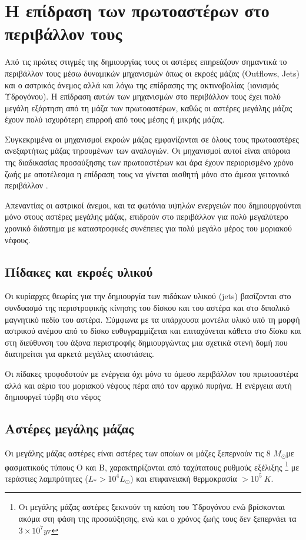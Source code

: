 \documentclass[a4paper,12pt]{memoir}
\newcommand{\sm}{$M_{\odot}$}
\begin{document}
\section{Η επίδραση των πρωτοαστέρων στο περιβάλλον τους}

Από τις πρώτες στιγμές της δημιουργίας τους οι αστέρες επηρεάζουν σημαντικά το περιβάλλον τους μέσω δυναμικών μηχανισμών όπως οι εκροές μάζας (Outflows, Jets) και ο αστρικός άνεμος αλλά και λόγω της επίδρασης της ακτινοβολίας (ιονισμός Υδρογόνου). Η επίδραση αυτών των μηχανισμών στο περιβάλλον τους έχει πολύ μεγάλη εξάρτηση από τη μάζα των πρωτοαστέρων, καθώς οι αστέρες μεγάλης μάζας έχουν πολύ ισχυρότερη επιρροή από τους μέσης ή μικρής μάζας.

Συγκεκριμένα οι μηχανισμοί εκροών μάζας εμφανίζονται σε όλους τους πρωτοαστέρες ανεξαρτήτως μάζας τηρουμένων των αναλογιών. Οι μηχανισμοί αυτοί είναι απόροια της διαδικασίας προσαύξησης των πρωτοαστέρων και άρα έχουν περιορισμένο χρόνο ζωής με αποτέλεσμα η επίδραση τους να γίνεται αισθητή μόνο στο άμεσα γειτονικό περιβάλλον . 

Απεναντίας οι αστρικοί άνεμοι, και τα φωτόνια υψηλών ενεργειών που δημιουργούνται μόνο στους αστέρες μεγάλης μάζας, επιδρούν στο περιβάλλον για πολύ μεγαλύτερο χρονικό διάστημα με καταστροφικές συνέπειες για πολύ μεγάλο μέρος του μοριακού νέφους.


\subsection{Πίδακες και εκροές υλικού}
Οι κυρίαρχες θεωρίες για την δημιουργία των πιδάκων υλικού (jets) βασίζονται στο συνδυασμό της περιστροφικής κίνησης του δίσκου και του αστέρα και στο διπολικό μαγνητικό πεδίο του αστέρα. 
Σύμφωνα με τα υπάρχουσα μοντέλα υλικό υπό τη μορφή αστρικού ανέμου από το δίσκο ευθυγραμμίζεται και επιταχύνεται κάθετα στο δίσκο και στη διεύθυνση του άξονα περιστροφής δημιουργώντας μια σχετικά στενή δομή που διατηρείται για αρκετά μεγάλες αποστάσεις.

Οι πίδακες τροφοδοτούν με ενέργεια όχι μόνο το άμεσο περιβάλλον του πρωτοαστέρα αλλά και αέριο του μοριακού νέφους πέρα από τον αρχικό πυρήνα. Η ενέργεια αυτή δημιουργεί τύρβη στο νέφος


\subsection{Αστέρες μεγάλης μάζας}
Οι μεγάλης μάζας αστέρες είναι αστέρες των οποίων οι μάζες ξεπερνούν τις 8 \sm με φασματικούς τύπους O και B, χαρακτηρίζονται από ταχύτατους ρυθμούς εξέλιξης \footnote{Οι μεγάλης μάζας αστέρες ξεκινούν τη καύση του Υδρογόνου ενώ βρίσκονται ακόμα στη φάση της προσαύξησης, ενώ και ο χρόνος ζωής τους δεν ξεπερνάει τα $3 \times 10 ^7 yr$} με τεράστιες λαμπρότητες ($L_* > 10^4 L _ \odot$) και επιφανειακή θερμοκρασία $>10 ^5 \ K$.
\end{document}
